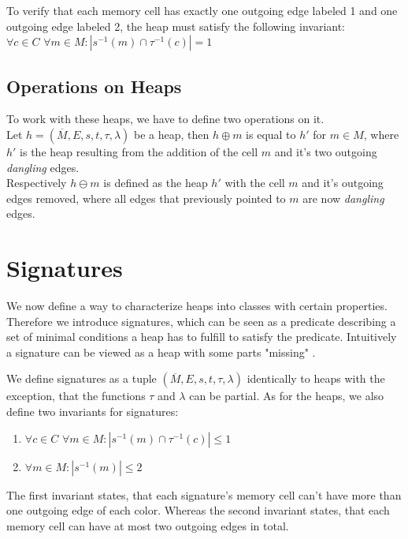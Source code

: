 \noindent
To verify that each memory cell has exactly one outgoing edge labeled 1 and one outgoing edge labeled 2, the heap must satisfy
the following invariant:\\

$\forall c \in C$ $\forall m \in M : |s^{-1}(m) \cap \tau^{-1}(c)| = 1$ \\

\noindent
\subsection{Operations on Heaps}
To work with these heaps, we have to define two operations on it. \\
Let $h = (\overline{M}, E, s, t, \tau, \lambda)$ be a heap, 
then $h \oplus m$ is equal to $h'$ for $m \in M$, where $h'$ is the heap resulting from the addition of the cell $m$ and it's two
outgoing \textit{dangling} edges.\\
Respectively $h \ominus m$ is defined as the heap $h'$ with the cell $m$ and it's outgoing edges removed, where
all edges that previously pointed to $m$ are now \textit{dangling} edges.

\newpage
\section{Signatures}
We now define a way to characterize heaps into classes with certain properties.
Therefore we introduce signatures, which can be seen as a predicate describing a set of minimal
conditions a heap has to fulfill to satisfy the predicate. 
Intuitively a signature can be viewed as a heap with some parts "missing" \cite{abdulla2013monotonic}. 

\noindent
We define signatures as a tuple $(\overline{M}, E, s, t, \tau, \lambda)$ identically to heaps with the exception,
that the functions $\tau$ and $\lambda$ can be partial. As for the heaps, we also define two invariants for
signatures:

\begin{enumerate}
	\item $\forall c \in C$ $\forall m \in M : |s^{-1}(m) \cap \tau^{-1}(c)| \le 1$
	\item $\forall m \in M : |s^{-1}(m)| \le 2$
\end{enumerate}

\noindent
The first invariant states, that each signature's memory cell can't have more than one outgoing edge of each color.
Whereas the second invariant states, that each memory cell can have at most two outgoing edges in total.

